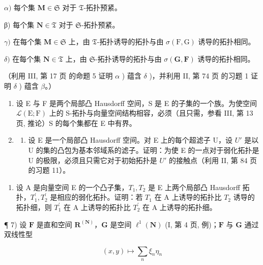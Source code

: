 \(\alpha)\) 每个集 \(\mathbf{M} \in \mathfrak{S}\) 对于 \(\mathfrak{T}\)-拓扑预紧。

β) 每个集 \(\mathbf{N} \in \mathfrak{T}\) 对于 \(\mathfrak{S}\)-拓扑预紧。

\(\gamma)\) 在每个集 \(\mathbf{M} \in \mathfrak{S}\) 上，由 \(\mathfrak{T}\)-拓扑诱导的拓扑与由 \(\sigma(\mathrm{F}, \mathrm{G})\) 诱导的拓扑相同。

\(\delta)\) 在每个集 \(\mathbf{N} \in \mathfrak{T}\) 上，由 \(\mathfrak{S}\)-拓扑诱导的拓扑与由 \(\sigma(\mathbf{G}, \mathbf{F})\) 诱导的拓扑相同。

（利用 III, 第 17 页 的命题 5 证明 \(\alpha\) ) 蕴含 \(\delta\) )，并利用 II, 第 74 页 的习题 1 证明 \(\delta\) ) 蕴含 \(\beta\)。）

\begin{enumerate}
\def\labelenumi{\arabic{enumi})}
\setcounter{enumi}{4}
\item
  设 E 与 F 是两个局部凸 Hausdorff 空间，S 是 E 的子集的一个族。为使空间 \(\mathcal{L}(\mathrm{E};\mathrm{F})\) 上的 S-拓扑与向量空间结构相容，必须（且只需，参看 III, 第 13 页, 推论）S 的每个集都在 E 中有界。
\item
  \begin{enumerate}
  \def\labelenumii{\alph{enumii})}
  \tightlist
  \item
    设 E 是一个局部凸 Hausdorff 空间。对 E 上的每个超滤子 U，设 \(U'\) 是以 U 的集的凸包为基本邻域系的滤子。证明：为使 E 的一点对于弱化拓扑是 U 的极限，必须且只需它对于初始拓扑是 \(U'\) 的接触点（利用 II, 第 84 页 的习题 11）。
  \end{enumerate}
\end{enumerate}

\begin{enumerate}
\def\labelenumi{\alph{enumi})}
\setcounter{enumi}{1}
\tightlist
\item
  设 A 是向量空间 E 的一个凸子集，\(T_{1}, T_{2}\) 是 E 上两个局部凸 Hausdorff 拓扑，\(T_{1}^{\prime}, T_{2}^{\prime}\) 是相应的弱化拓扑。证明：若 \(T_{1}\) 在 A 上诱导的拓扑比 \(T_{2}\) 诱导的拓扑细，则 \(T_{1}^{\prime}\) 在 A 上诱导的拓扑比 \(T_{2}^{\prime}\) 在 A 上诱导的拓扑细。
\end{enumerate}

¶ 7) 设 \(\mathbf{F}\) 是直和空间 \(\mathbf{R}^{(\mathbf{N})}\)，\(\mathbf{G}\) 是空间 \(\ell^1 (\mathbf{N})\) (I, 第 4 页, 例)；\(\mathbf{F}\) 与 \(\mathbf{G}\) 通过双线性型

\[
(x, y) \mapsto \sum_ {n} \xi_ {n} \eta_ {n}
\]

